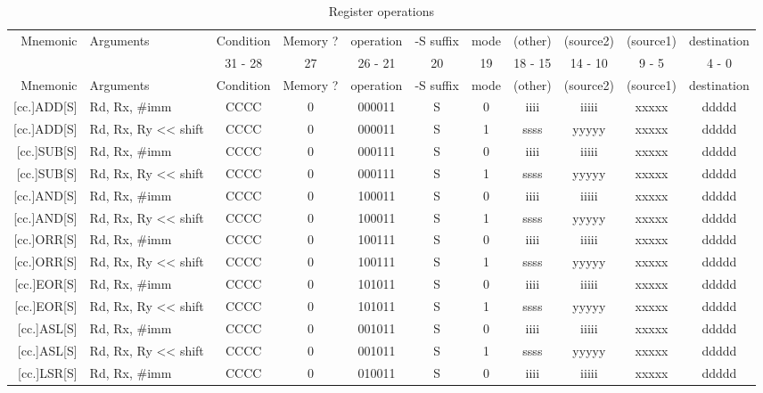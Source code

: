\documentclass{article}
\begin{document}
\newpage
\begin{longtable}{|r|l|c|c|c|c|c|ccc|c|}
    \caption{Register operations} \\
    \hline
    Mnemonic & Arguments & Condition & Memory ? & operation & -S suffix & mode & (other) & (source2) & (source1) & destination \\
    & & 31 - 28 & 27 & 26 - 21 & 20 & 19 & 18 - 15 & 14 - 10 & 9 - 5 & 4 - 0 \\
    \hline
    \endfirsthead
    \hline
    Mnemonic & Arguments & Condition & Memory ? & operation & -S suffix & mode & (other) & (source2) & (source1) & destination \\
    \hline
    \endhead
    \hline
    \endfoot
    \hline
    \endlastfoot
    {[}cc.]ADD[S] & Rd, Rx, \#imm & CCCC & 0 & 000011 & S & 0 & iiii & iiiii & xxxxx & ddddd \\
    {[}cc.]ADD[S] & Rd, Rx, Ry << shift & CCCC & 0 & 000011 & S & 1 & ssss & yyyyy & xxxxx & ddddd \\
    \hline
    {[}cc.]SUB[S] & Rd, Rx, \#imm & CCCC & 0 & 000111 & S & 0 & iiii & iiiii & xxxxx & ddddd \\
    {[}cc.]SUB[S] & Rd, Rx, Ry << shift & CCCC & 0 & 000111 & S & 1 & ssss & yyyyy & xxxxx & ddddd \\
    \hline
    {[}cc.]AND[S] & Rd, Rx, \#imm & CCCC & 0 & 100011 & S & 0 & iiii & iiiii & xxxxx & ddddd \\
    {[}cc.]AND[S] & Rd, Rx, Ry << shift & CCCC & 0 & 100011 & S & 1 & ssss & yyyyy & xxxxx & ddddd \\
    \hline
    {[}cc.]ORR[S] & Rd, Rx, \#imm & CCCC & 0 & 100111 & S & 0 & iiii & iiiii & xxxxx & ddddd \\
    {[}cc.]ORR[S] & Rd, Rx, Ry << shift & CCCC & 0 & 100111 & S & 1 & ssss & yyyyy & xxxxx & ddddd \\
    \hline
    {[}cc.]EOR[S] & Rd, Rx, \#imm & CCCC & 0 & 101011 & S & 0 & iiii & iiiii & xxxxx & ddddd \\
    {[}cc.]EOR[S] & Rd, Rx, Ry << shift & CCCC & 0 & 101011 & S & 1 & ssss & yyyyy & xxxxx & ddddd \\
    \hline
    {[}cc.]ASL[S] & Rd, Rx, \#imm & CCCC & 0 & 001011 & S & 0 & iiii & iiiii & xxxxx & ddddd \\
    {[}cc.]ASL[S] & Rd, Rx, Ry << shift & CCCC & 0 & 001011 & S & 1 & ssss & yyyyy & xxxxx & ddddd \\
    \hline
    {[}cc.]LSR[S] & Rd, Rx, \#imm & CCCC & 0 & 010011 & S & 0 & iiii & iiiii & xxxxx & ddddd \\

\end{longtable}
\end{document}

